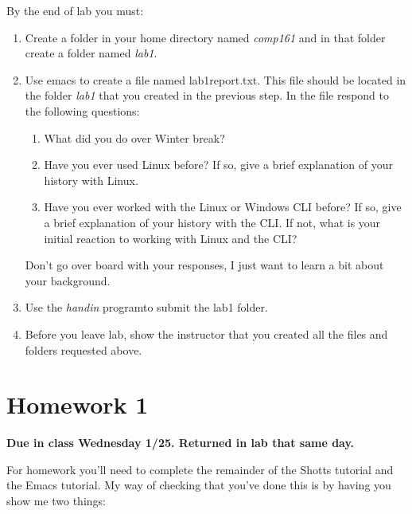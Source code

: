 \documentclass[nobib]{tufte-handout}
\begin{document}
By the end of lab you must:
\begin{enumerate}
\item Create a folder in your home directory named \textit{comp161} and in that folder create a folder named \textit{lab1}.
\item Use emacs to create a file named lab1report.txt. This file should be located in the folder \textit{lab1} that you created in the previous step. In the file respond to the following questions:
\begin{enumerate}
\item What did you do over Winter break?
\item Have you ever used Linux before? If so, give a brief explanation of your history with Linux.
\item Have you ever worked with the Linux or Windows CLI before? If so, give a brief explanation of your history with the CLI\@. If not, what is your initial reaction to working with Linux and the CLI\@?
\end{enumerate}
Don't go over board with your responses, I just want to learn a bit about your background.
\item Use the \textit{handin} programto submit the lab1 folder.
\item Before you leave lab, show the instructor that you created all the files and folders requested above.
\end{enumerate}

\section{Homework 1}

\begin{center}
\textbf{Due in class Wednesday 1/25. Returned in lab that same day.}
\end{center}

For homework you'll need to complete the remainder of the Shotts tutorial and the Emacs tutorial.  My way of checking that you've done this is by having you show me two things:
\end{document}
